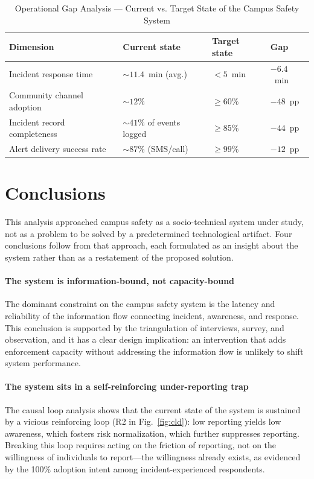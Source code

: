 \documentclass[conference]{IEEEtran}
\begin{document}
\begin{table}[t]
\caption{Operational Gap Analysis --- Current vs. Target State of the Campus Safety System}
\label{tab:gap}
\centering
\renewcommand{\arraystretch}{1.25}
\begin{tabular}{p{4.5cm}p{4.5cm}p{3.5cm}p{3.5cm}}
\toprule
\textbf{Dimension} & \textbf{Current state} & \textbf{Target state} & \textbf{Gap} \\
\midrule
Incident response time & \(\sim 11.4\)~min (avg.) & \(< 5\)~min & \(-6.4\)~min \\
Community channel adoption & \(\sim 12\%\) & \(\geq 60\%\) & \(-48\)~pp \\
Incident record completeness & \(\sim 41\%\) of events logged & \(\geq 85\%\) & \(-44\)~pp \\
Alert delivery success rate & \(\sim 87\%\) (SMS/call) & \(\geq 99\%\) & \(-12\)~pp \\
\bottomrule
\end{tabular}
\end{table}

\section{Conclusions}

This analysis approached campus safety as a socio-technical system
under study, not as a problem to be solved by a predetermined
technological artifact. Four conclusions follow from that approach,
each formulated as an insight about the system rather than as a
restatement of the proposed solution.

\paragraph{The system is information-bound, not capacity-bound}
The dominant constraint on the campus safety system is the latency
and reliability of the information flow connecting incident,
awareness, and response. This conclusion is supported by the
triangulation of interviews, survey, and observation, and it has a
clear design implication: an intervention that adds enforcement
capacity without addressing the information flow is unlikely to
shift system performance.

\paragraph{The system sits in a self-reinforcing under-reporting trap}
The causal loop analysis shows that the current state of the system
is sustained by a vicious reinforcing loop (R2 in Fig.~\ref{fig:cld}):
low reporting yields low awareness, which fosters risk normalization,
which further suppresses reporting. Breaking this loop requires
acting on the friction of reporting, not on the willingness of
individuals to report---the willingness already exists, as evidenced
by the 100\% adoption intent among incident-experienced respondents.
\end{document}
